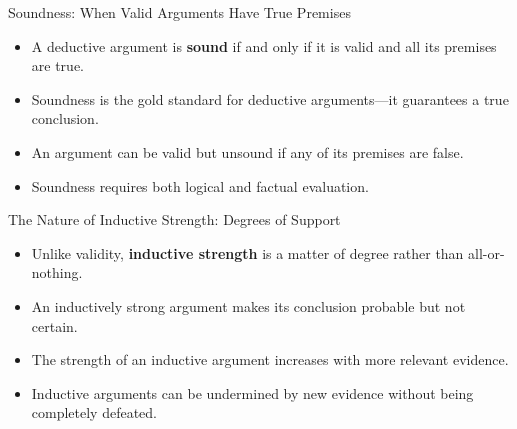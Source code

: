\documentclass{beamer}
\begin{document}
\begin{frame}{Soundness: When Valid Arguments Have True Premises}
    \begin{itemize}
        \item A deductive argument is \textbf{sound} if and only if it is valid and all its premises are true.
        \item Soundness is the gold standard for deductive arguments—it guarantees a true conclusion.
        \item An argument can be valid but unsound if any of its premises are false.
        \item Soundness requires both logical and factual evaluation.
    \end{itemize}
    
\end{frame}

\begin{frame}{The Nature of Inductive Strength: Degrees of Support}
    \begin{itemize}
        \item Unlike validity, \textbf{inductive strength} is a matter of degree rather than all-or-nothing.
        \item An inductively strong argument makes its conclusion probable but not certain.
        \item The strength of an inductive argument increases with more relevant evidence.
        \item Inductive arguments can be undermined by new evidence without being completely defeated.
    \end{itemize}
    
\end{frame}
\end{document}
